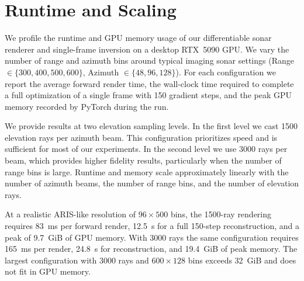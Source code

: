 \section{Runtime and Scaling}
\label{sec:runtime_memory}

We profile the runtime and GPU memory usage of our differentiable sonar renderer and single-frame inversion on a desktop RTX~5090 GPU. We vary the number of range and azimuth bins around typical imaging sonar settings (Range $\in \{300, 400, 500, 600\}$, Azimuth $\in \{48, 96, 128\}$). For each configuration we report the average forward render time, the wall-clock time required to complete a full optimization of a single frame with 150 gradient steps, and the peak GPU memory recorded by PyTorch during the run.

We provide results at two elevation sampling levels. In the first level we cast 1500 elevation rays per azimuth beam. This configuration prioritizes speed and is sufficient for most of our experiments. In the second level we use 3000 rays per beam, which provides higher fidelity results, particularly when the number of range bins is large. Runtime and memory scale approximately linearly with the number of azimuth beams, the number of range bins, and the number of elevation rays.

At a realistic ARIS-like resolution of $96 \times 500$ bins, the 1500-ray rendering requires 83~ms per forward render, 12.5~s for a full 150-step reconstruction, and a peak of 9.7~GiB of GPU memory. With 3000 rays the same configuration requires 165~ms per render, 24.8~s for reconstruction, and 19.4~GiB of peak memory. The largest configuration with 3000 rays and $600 \times 128$ bins exceeds 32~GiB and does not fit in GPU memory.

